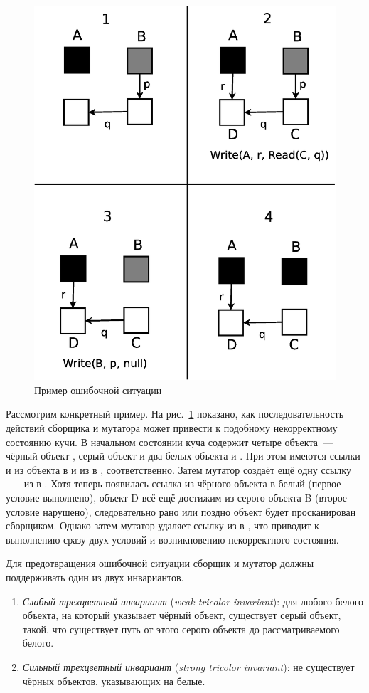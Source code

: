 \begin{figure}[h!]
\centering
\includegraphics[width=0.4\linewidth]{Moiseenko/images/inc_marking.eps}
\caption{Пример ошибочной ситуации}
\label{fig:inc_marking}
\end{figure}

Рассмотрим конкретный пример. На рис.~\ref{fig:inc_marking} показано, как последовательность 
действий сборщика и мутатора может привести к подобному некорректному состоянию кучи. 
В начальном состоянии куча содержит четыре объекта~--- чёрный объект , 
серый объект  и два белых объекта  и .
При этом имеются ссылки  и  из объекта  в  и из 
 в , соответственно. 
Затем мутатор создаёт ещё одну ссылку ~--- из  в . 
Хотя теперь появилась ссылка из чёрного объекта в белый (первое условие выполнено), 
объект D всё ещё достижим из серого объекта B (второе условие нарушено), следовательно 
рано или поздно объект  будет просканирован сборщиком. 
Однако затем мутатор удаляет ссылку из  в , что приводит к выполнению 
сразу двух условий и возникновению некорректного состояния.

Для предотвращения ошибочной ситуации сборщик и мутатор должны поддерживать один из двух 
инвариантов.

\begin{enumerate}
\item 
	\emph{Слабый трехцветный инвариант} (\emph{weak tricolor invariant}): для любого 
	белого объекта, на который указывает чёрный объект, существует серый объект, такой, 
	что существует путь от этого серого объекта до рассматриваемого белого.
\item 
	\emph{Сильный трехцветный инвариант} (\emph{strong tricolor invariant}): не существует 
	чёрных объектов, указывающих на белые.
\end{enumerate}

